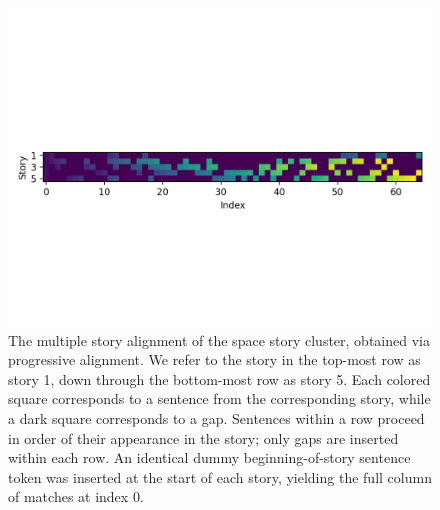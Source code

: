 \documentclass{article}
\begin{document}
\begin{figure}[h]
\centering
\includegraphics[width=5in,trim=0em 12em 0em 12em,clip]{img/msa3167.png}
\caption{
\label{fig:msa}
The multiple story alignment of the space story cluster, obtained via progressive alignment.
We refer to the story in the top-most row as story 1, down through the bottom-most row
as story 5.
Each colored square corresponds to a sentence from the corresponding story,
while a dark square corresponds to a gap.
Sentences within a row proceed in order of their appearance in the story;
only gaps are inserted within each row.
An identical dummy beginning-of-story sentence token was inserted at the start of each story,
yielding the full column of matches at index 0.
}
\end{figure}
\end{document}
